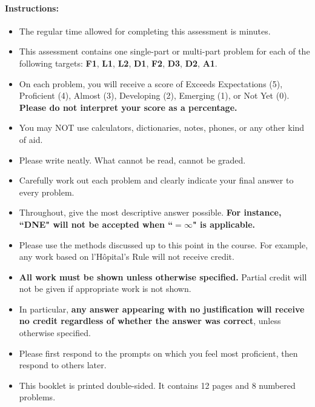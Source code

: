 \documentclass[11pt]{article}
\begin{document}
{%

\paragraph*{Instructions:}

\begin{itemize}
    
    \item The regular time allowed for completing this assessment is  minutes.
    \item This assessment contains one single-part or multi-part problem for each of the following targets: {\bf\color{ProcessBlue}F1}, {\bf\color{RoyalBlue}L1}, {\bf\color{RoyalBlue}L2}, {\bf\color{ForestGreen}D1}, {\bf\color{ProcessBlue}F2}, {\bf\color{ForestGreen}D3}, {\bf\color{ForestGreen}D2}, {\bf\color{RedOrange}A1}.
    \item On each problem, you will receive a score of Exceeds Expectations (5), Proficient (4), Almost (3), Developing (2), Emerging (1), or Not Yet (0). {\bf Please do not interpret your score as a percentage.}
    \item You may NOT use calculators, dictionaries, notes, phones, or any other kind of aid.
    \item Please write neatly. What cannot be read, cannot be graded.
    \item Carefully work out each problem and clearly indicate your final answer to every problem.
    \item Throughout, give the most descriptive answer possible. \textbf{For instance, ``DNE" will not be accepted when ``$=\infty$" is applicable.}
    \item Please use the methods discussed up to this point in the course. For example, any work based on l'H\^opital's Rule will not receive credit.
    \item \textbf{All work must be shown unless otherwise specified.} Partial credit will not be given if appropriate work is not shown.
    \item In particular, {\bf any answer appearing with no justification will receive no credit regardless of whether the answer was correct}, unless otherwise specified.
    \item Please first respond to the prompts on which you feel most proficient, then respond to others later.
    \item This booklet is printed double-sided. It contains 12 pages and 8 numbered problems.
    \end{itemize}
    
    }
\end{document}
